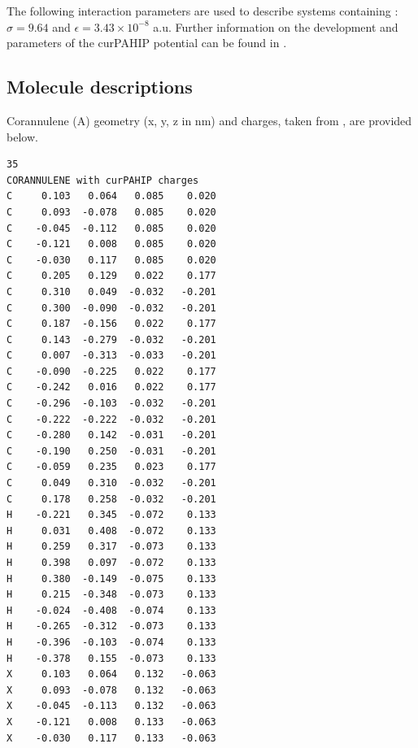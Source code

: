 The following interaction parameters are used to describe systems containing : $\sigma = 9.64$ and $\epsilon = 3.43\times10^{-8}$ a.u. Further information on the development and parameters of the curPAHIP potential can be found in \citet{bowal2019ion}.


\subsection{Molecule descriptions}
\label{sec:SImoleculedesc}
Corannulene (A) geometry (x, y, z in nm) and charges, taken from \citet{bowal2019ion}, are provided below.
%
\begin{verbatim}
35 
CORANNULENE with curPAHIP charges
C     0.103   0.064   0.085    0.020  
C     0.093  -0.078   0.085    0.020  
C    -0.045  -0.112   0.085    0.020  
C    -0.121   0.008   0.085    0.020  
C    -0.030   0.117   0.085    0.020  
C     0.205   0.129   0.022    0.177  
C     0.310   0.049  -0.032   -0.201 
C     0.300  -0.090  -0.032   -0.201 
C     0.187  -0.156   0.022    0.177  
C     0.143  -0.279  -0.032   -0.201 
C     0.007  -0.313  -0.033   -0.201 
C    -0.090  -0.225   0.022    0.177  
C    -0.242   0.016   0.022    0.177  
C    -0.296  -0.103  -0.032   -0.201 
C    -0.222  -0.222  -0.032   -0.201 
C    -0.280   0.142  -0.031   -0.201 
C    -0.190   0.250  -0.031   -0.201 
C    -0.059   0.235   0.023    0.177  
C     0.049   0.310  -0.032   -0.201 
C     0.178   0.258  -0.032   -0.201 
H    -0.221   0.345  -0.072    0.133  
H     0.031   0.408  -0.072    0.133  
H     0.259   0.317  -0.073    0.133  
H     0.398   0.097  -0.072    0.133  
H     0.380  -0.149  -0.075    0.133  
H     0.215  -0.348  -0.073    0.133  
H    -0.024  -0.408  -0.074    0.133  
H    -0.265  -0.312  -0.073    0.133  
H    -0.396  -0.103  -0.074    0.133  
H    -0.378   0.155  -0.073    0.133  
X     0.103   0.064   0.132   -0.063 
X     0.093  -0.078   0.132   -0.063 
X    -0.045  -0.113   0.132   -0.063 
X    -0.121   0.008   0.133   -0.063 
X    -0.030   0.117   0.133   -0.063
\end{verbatim}

